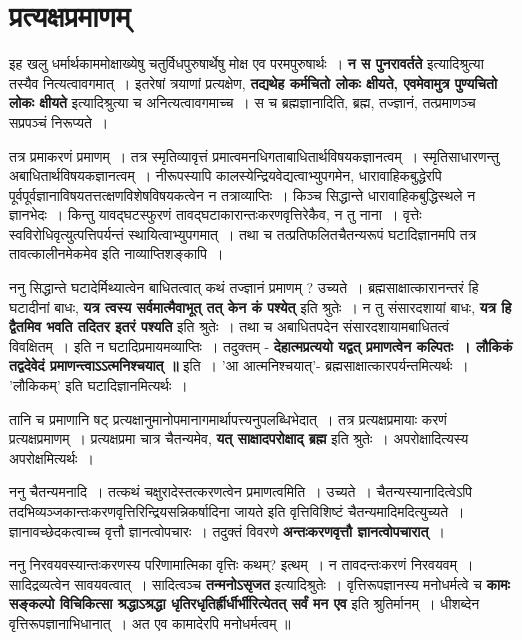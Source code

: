 \section{प्रत्यक्षप्रमाणम्}
	इह खलु धर्मार्थकाममोक्षाख्येषु चतुर्विधपुरुषार्थेषु मोक्ष एव परमपुरुषार्थः~। {\bfseries न स पुनरावर्तते} इत्यादिश्रुत्या तस्यैव नित्यत्वावगमात्~। इतरेषां त्रयाणां प्रत्यक्षेण, {\bfseries तद्यथेह कर्मचितो लोकः क्षीयते, एवमेवामुत्र पुण्यचितो लोकः क्षीयते} इत्यादिश्रुत्या च अनित्यत्वावगमाच्च~। स च ब्रह्मज्ञानादिति, ब्रह्म, तज्ज्ञानं, तत्प्रमाणञ्च सप्रपञ्चं निरूप्यते~। \par
	तत्र प्रमाकरणं प्रमाणम्~। तत्र स्मृतिव्यावृत्तं प्रमात्वमनधिगताबाधितार्थविषयकज्ञानत्वम्~। स्मृतिसाधारणन्तु अबाधितार्थविषयकज्ञानत्वम्~। नीरूपस्यापि कालस्येन्द्रियवेद्यत्वाभ्युपगमेन, धारावाहिकबुद्धेरपि पूर्वपूर्वज्ञानाविषयतत्तत्क्षणविशेषविषयकत्वेन न तत्राव्याप्तिः~। किञ्च सिद्धान्ते धारावाहिकबुद्धिस्थले न ज्ञानभेदः~। किन्तु यावद्घटस्फुरणं तावद्घटाकारान्तःकरणवृत्तिरेकैव, न तु नाना~। वृत्तेः स्वविरोधिवृत्युत्पत्तिपर्यन्तं स्थायित्वाभ्युपगमात्~। तथा च तत्प्रतिफलितचैतन्यरूपं घटादिज्ञानमपि तत्र तावत्कालीनमेकमेव इति नाव्याप्तिशङ्कापि~।\par
	ननु सिद्धान्ते घटादेर्मिथ्यात्वेन बाधितत्वात् कथं तज्ज्ञानं प्रमाणम् ? उच्यते~। ब्रह्मसाक्षात्कारानन्तरं हि घटादीनां बाधः, {\bfseries यत्र त्वस्य सर्वमात्मैवाभूत् तत् केन कं पश्येत्} इति श्रुतेः~। न तु संसारदशायां बाधः, {\bfseries यत्र हि द्वैतमिव भवति तदितर इतरं पश्यति} इति श्रुतेः~। तथा च अबाधितपदेन संसारदशायामबाधितत्वं विवक्षितम्~। इति न घटादिप्रमायमव्याप्तिः~। तदुक्तम् - {\bfseries देहात्मप्रत्ययो यद्वत् प्रमाणत्वेन कल्पितः~। लौकिकं तद्वदेवेदं प्रमाणन्त्वाऽऽत्मनिश्चयात् ॥} इति~। 'आ आत्मनिश्चयात्'- ब्रह्मसाक्षात्कारपर्यन्तमित्यर्थः~। 'लौकिकम्' इति घटादिज्ञानमित्यर्थः~।\par
	तानि च प्रमाणानि षट् प्रत्यक्षानुमानोपमानागमार्थापत्त्यनुपलब्धिभेदात्~। तत्र प्रत्यक्षप्रमायाः करणं प्रत्यक्षप्रमाणम्~। प्रत्यक्षप्रमा चात्र चैतन्यमेव, {\bfseries यत् साक्षादपरोक्षाद् ब्रह्म} इति श्रुतेः~। अपरोक्षादित्यस्य अपरोक्षमित्यर्थः~। \par
	ननु चैतन्यमनादि~। तत्कथं चक्षुरादेस्तत्करणत्वेन प्रमाणत्वमिति~। उच्यते~। चैतन्यस्यानादित्वेऽपि तदभिव्यञ्जकान्तःकरणवृत्तिरिन्द्रियसन्निकर्षादिना जायते इति वृत्तिविशिष्टं चैतन्यमादिमदित्युच्यते~। ज्ञानावच्छेदकत्वाच्च वृत्तौ ज्ञानत्वोपचारः~। तदुक्तं विवरणे {\bfseries अन्तःकरणवृत्तौ ज्ञानत्वोपचारात्}~। \par 
	ननु निरवयवस्यान्तःकरणस्य परिणामात्मिका वृत्तिः कथम्? इत्थम्~। न तावदन्तःकरणं निरवयवम्~। सादिद्रव्यत्वेन सावयवत्वात्~। सादित्वञ्च {\bfseries तन्मनोऽसृजत} इत्यादिश्रुतेः~। वृत्तिरूपज्ञानस्य मनोधर्मत्वे च {\bfseries कामः सङ्कल्पो विचिकित्सा श्रद्धाऽश्रद्धा धृतिरधृतिर्ह्रीर्धीर्भीरित्येतत् सर्वं मन एव} इति श्रुतिर्मानम्~। धीशब्देन वृत्तिरूपज्ञानाभिधानात्~। अत एव कामादेरपि मनोधर्मत्वम् ॥ \par
